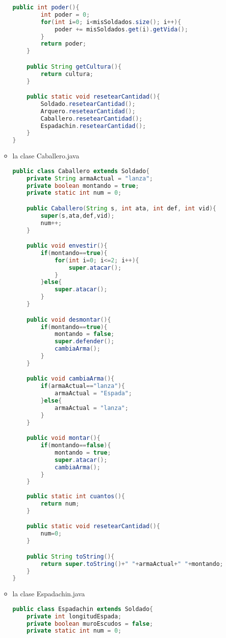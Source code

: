 \documentclass{article}
\begin{document}
\begin{itemize}
\begin{itemize}
\begin{lstlisting}[language=java]
    public int poder(){
        int poder = 0;
        for(int i=0; i<misSoldados.size(); i++){
            poder += misSoldados.get(i).getVida();
        }
        return poder;
    }

    public String getCultura(){
        return cultura;
    }

    public static void resetearCantidad(){
        Soldado.resetearCantidad();
        Arquero.resetearCantidad();
        Caballero.resetearCantidad();
        Espadachin.resetearCantidad();
    }
}

        \end{lstlisting}

                \item la clase Caballero.java
        \begin{lstlisting}[language=java]
public class Caballero extends Soldado{
    private String armaActual = "lanza";
    private boolean montando = true;
    private static int num = 0;

    public Caballero(String s, int ata, int def, int vid){
        super(s,ata,def,vid);
        num++;
    }

    public void envestir(){
        if(montando==true){
            for(int i=0; i<=2; i++){
                super.atacar();
            }
        }else{
            super.atacar();
        }
    }

    public void desmontar(){
        if(montando==true){
            montando = false;
            super.defender();
            cambiaArma();
        }
    }

    public void cambiaArma(){
        if(armaActual=="lanza"){
            armaActual = "Espada";
        }else{
            armaActual = "lanza";
        }
    }

    public void montar(){
        if(montando==false){
            montando = true;
            super.atacar();
            cambiaArma();
        }
    }
    
    public static int cuantos(){
        return num;
    }

    public static void resetearCantidad(){
        num=0;
    }

    public String toString(){
        return super.toString()+" "+armaActual+" "+montando;
    }
}

        \end{lstlisting}

                \item la clase Espadachin.java
        \begin{lstlisting}[language=java]
public class Espadachin extends Soldado{
    private int longitudEspada;
    private boolean muroEscudos = false;
    private static int num = 0;


\end{lstlisting}
\end{itemize}
\end{itemize}
\end{document}
